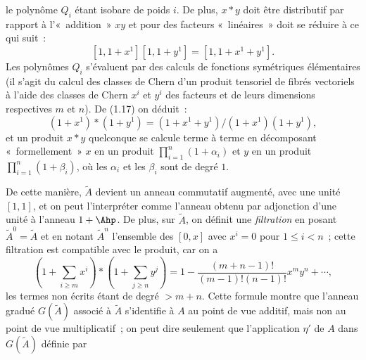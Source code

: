 le
polynôme $Q_i$ étant isobare de poids $i$. De plus, $x*y$ doit être distributif par rapport à l'«~addition~» $xy$ et pour des facteurs «~linéaires~» doit se réduire à ce qui suit~:
\begin{equation}\tag{1.17}
[1,1+x^1][1,1+y^1]=[1,1+x^1+y^1].
\end{equation}
Les polynômes $Q_i$ s'évaluent par des calculs de fonctions symétriques élémentaires (il s'agit du calcul des classes de Chern d'un produit tensoriel de fibrés vectoriels à l'aide des classes de Chern $x^i$ et $y^i$ des facteurs et de leurs dimensions respectives $m$ et $n$). De (1.17) on déduit~:
\begin{equation}\tag{1.17 bis}
(1+x^1)*(1+y^1)=(1+x^1+y^1)/(1+x^1)(1+y^1),
\end{equation}
et un produit $x*y$ quelconque se calcule terme à terme en décomposant «~formellement~» $x$ en un produit $\prod_{i=1}^n(1+\alpha_i)$ et $y$ en un produit $\prod_{i=1}^n(1+\beta_i)$, où les $\alpha_i$ et les $\beta_i$ sont de degré $1$.

De cette manière, $\widetilde A$ devient un anneau commutatif augmenté, avec une unité $[1,1]$, et on peut l'interpréter comme l'anneau obtenu par adjonction d'une unité à l'anneau $1+\Ahp$. De plus, sur $\widetilde A$, on définit une \emph{filtration} en posant $\widetilde A^0=\widetilde A$ et en notant $\widetilde A^n$ l'ensemble des $[0,x]$ avec $x^i=0$ pour $1\leq i<n$~; cette filtration est compatible avec le produit, car on a
\begin{equation}\tag{1.18}
\left(1+\sum_{i\geq m}x^i\right)*\left(1+\sum_{j\geq n}y^j\right)
=1-\frac{(m+n-1)!}{(m-1)!(n-1)!}x^m y^n+\cdots,
\end{equation}
les termes non écrits étant de degré $>m+n$. Cette formule montre que l'anneau gradué $G(\widetilde A)$ associé à $\widetilde A$ s'identifie à $A$ au point de vue additif, mais non au point de vue multiplicatif~; on peut dire seulement que l'application $\eta'$ de $A$ dans $G(\widetilde A)$ définie par
